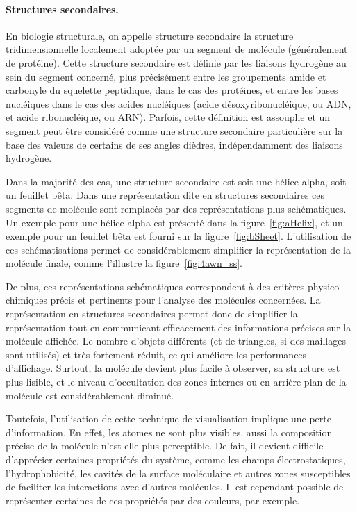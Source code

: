 	\paragraph{Structures secondaires.} En biologie structurale, on appelle structure secondaire la structure tridimensionnelle localement adoptée par un segment de molécule (généralement de protéine). Cette structure secondaire est définie par les liaisons hydrogène au sein du segment concerné, plus précisément entre les groupements amide et carbonyle du squelette peptidique, dans le cas des protéines, et entre les bases nucléiques dans le cas des acides nucléiques (acide désoxyribonucléique, ou ADN, et acide ribonucléique, ou ARN). Parfois, cette définition est assouplie et un segment peut être considéré comme une structure secondaire particulière sur la base des valeurs de certains de ses angles dièdres, indépendamment des liaisons hydrogène.
		
	Dans la majorité des cas, une structure secondaire est soit une hélice alpha, soit un feuillet bêta. Dans une représentation dite \og en structures secondaires \fg{} ces segments de molécule sont remplacés par des représentations plus schématiques. Un exemple pour une hélice alpha est présenté dans la figure~\ref{fig:aHelix}, et un exemple pour un feuillet bêta est fourni sur la figure~\ref{fig:bSheet}. L'utilisation de ces schématisations permet de considérablement simplifier la représentation de la molécule finale, comme l'illustre la figure~\ref{fig:4awn_ss}.
		
	De plus, ces représentations schématiques correspondent à des critères physico-chimiques précis et pertinents pour l'analyse des molécules concernées. La représentation en structures secondaires permet donc de simplifier la représentation tout en communicant efficacement des informations précises sur la molécule affichée. Le nombre d'objets différents (et de triangles, si des maillages sont utilisés) et très fortement réduit, ce qui améliore les performances d'affichage. Surtout, la molécule devient plus facile à observer, sa structure est plus lisible, et le niveau d'occultation des zones internes ou en arrière-plan de la molécule est considérablement diminué.
		
	Toutefois, l'utilisation de cette technique de visualisation implique une perte d'information. En effet, les atomes ne sont plus visibles, aussi la composition précise de la molécule n'est-elle plus perceptible. De fait, il devient difficile d'apprécier certaines propriétés du système, comme les champs électrostatiques, l'hydrophobicité, les cavités de la surface moléculaire et autres zones susceptibles de faciliter les interactions avec d'autres molécules. Il est cependant possible de représenter certaines de ces propriétés par des couleurs, par exemple.
		

